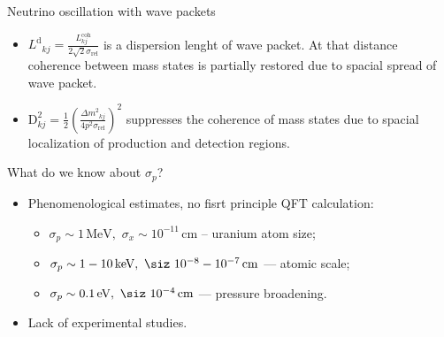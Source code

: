 \documentclass[usenames, dvipsnames]{beamer}
\newcommand{\Ld}{\ensuremath{L^{\text{d}}}}
\newcommand{\Dm}{\ensuremath{\Delta m^2}}
\newcommand{\Important}{\textcolor{BrickRed}}
\newcommand{\impitem}{\item[\Important{$\bullet$}]}
\newcommand{\sip}{\ensuremath{\sigma_p}}
\newcommand{\six}{\ensuremath{\sigma_x}}
\begin{document}
\begin{frame}[fragile]
\begin{columns}[T]
\begin{column}{.47\textwidth}
\begin{block}{Neutrino oscillation with wave packets}
\begin{itemize}
\begin{itemize}
        \item \Important{$\Ld_{kj}  =
            \frac{L^\text{coh}_{kj}}{2\sqrt{2}\sigma_{\text{rel}}}$} is a
            \Important{dispersion lenght} of wave packet. At that distance
             coherence between mass states is partially restored due to
             spacial spread of wave packet.
         \item \Important{\ensuremath{ \text{D}^2_{kj} =\frac{1}{2} \left(
             \frac{\Dm_{kj}}{4 p^2\sigma_\text{rel}} \right)^2}} 
         suppresses the coherence of mass states due to spacial localization of production and
             detection regions.
    \end{itemize}
  \end{itemize}
\end{block}


\begin{block}{What do we know about \sip?}
    \begin{itemize}
        \item Phenomenological estimates, no fisrt principle QFT calculation:
        \begin{itemize}
            \item $\sip \sim 1\, \text{MeV}, \,\, \six \sim 10^{-11}\, \text{cm}$
                -- uranium atom size;
            \item $\sip \sim 1-10 \, \text{keV}, \,\, \siz ~ 10^{-8} -
                10^{-7} \, \text{cm}$ --- atomic scale;
            \item $\sip \sim 0.1 \, \text{eV}, \,\, \siz ~ 10^{-4} \, \text{cm}$
                --- pressure broadening.
        \end{itemize}
        \impitem Lack of experimental studies.
    \end{itemize}
\end{block}


\end{column}
\end{columns}
\end{frame}
\end{document}

